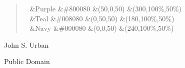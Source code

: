 \begin{DoxyDescription}
\begin{DoxyPre}
\begin{DoxyPre}
\begin{quote}
\begin{longtabu}
~  &Purple        &\#800080  &(50,0,50)      &(300\textordmasculine{},100\%,50\%)   
 \\
~  &Teal          &\#008080  &(0,50,50)      &(180\textordmasculine{},100\%,50\%)   
 \\
~  &Navy          &\#000080  &(0,0,50)       &(240\textordmasculine{},100\%,50\%)     
 \\
\end{longtabu}
\end{quote}
\end{DoxyPre}
\end{DoxyPre}



\begin{DoxyPre}
\begin{DoxyPre} \end{DoxyPre}
\end{DoxyPre}

\item[A\+U\+T\+H\+OR ]
\begin{DoxyPre}
\begin{DoxyPre}\end{DoxyPre}
\end{DoxyPre}



\begin{DoxyPre}
\begin{DoxyPre}    John S. Urban\end{DoxyPre}
\end{DoxyPre}



\begin{DoxyPre}
\begin{DoxyPre} \end{DoxyPre}
\end{DoxyPre}



\begin{DoxyPre}
\begin{DoxyPre} \end{DoxyPre}
\end{DoxyPre}

\item[L\+I\+C\+E\+N\+SE ]
\begin{DoxyPre}
\begin{DoxyPre}\end{DoxyPre}
\end{DoxyPre}



\begin{DoxyPre}
\begin{DoxyPre}    Public Domain\end{DoxyPre}
\end{DoxyPre}




\end{DoxyDescription}
